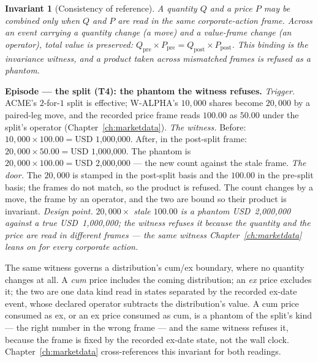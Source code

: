 \documentclass[11pt,a4paper]{article}
\newcommand{\USD}[1]{\mbox{USD~#1}}
\newtheorem{invariant}[definition]{Invariant}
\begin{document}
\begin{invariant}[Consistency of reference]\label{inv:consistency}
A quantity $Q$ and a price $P$ may be combined only when $Q$ and $P$ are read in
the same corporate-action frame. Across an event carrying a quantity change (a
move) and a value-frame change (an operator), total value is preserved:
$Q_{\text{pre}}\times P_{\text{pre}} = Q_{\text{post}}\times P_{\text{post}}$.
This binding is the \emph{invariance witness}, and a product taken across
mismatched frames is refused as a phantom.
\end{invariant}

\medskip\noindent\textbf{Episode --- the split (T4): the phantom the witness
refuses.}
\emph{Trigger.} ACME's $2$-for-$1$ split is effective; W-ALPHA's $10{,}000$
shares become $20{,}000$ by a paired-leg move, and the recorded price frame reads
$100.00$ as $50.00$ under the split's operator (Chapter~\ref{ch:marketdata}).
\emph{The witness.} Before: $10{,}000\times 100.00 = \USD{1{,}000{,}000}$. After,
in the post-split frame: $20{,}000\times 50.00 = \USD{1{,}000{,}000}$. The phantom
is $20{,}000\times 100.00 = \USD{2{,}000{,}000}$ --- the new count against the
stale frame. \emph{The door.} The $20{,}000$ is stamped in the post-split basis
and the $100.00$ in the pre-split basis; the frames do not match, so the product
is refused. The count changes by a move, the frame by an operator, and the two
are bound so their product is invariant.
\emph{Design point.} \emph{$20{,}000\times$ stale $100.00$ is a phantom
\USD{2{,}000{,}000} against a true \USD{1{,}000{,}000}; the witness refuses it
because the quantity and the price are read in different frames --- the same
witness Chapter~\ref{ch:marketdata} leans on for every corporate action.}

The same witness governs a distribution's cum/ex boundary, where no quantity
changes at all. A \emph{cum} price includes the coming distribution; an \emph{ex}
price excludes it; the two are one data kind read in states separated by the
recorded ex-date event, whose declared operator subtracts the distribution's
value. A cum price consumed as ex, or an ex price consumed as cum, is a phantom of
the split's kind --- the right number in the wrong frame --- and the same witness
refuses it, because the frame is fixed by the recorded ex-date state, not the wall
clock. Chapter~\ref{ch:marketdata} cross-references this invariant for both
readings.
\end{document}
